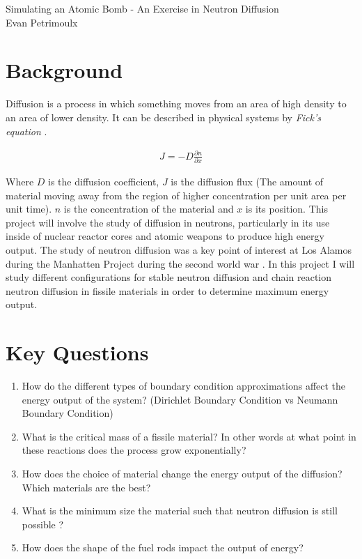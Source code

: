 \documentclass[letterpaper, 12pt]{article}
\begin{document}
    \begin{center}
        {\Large Simulating an Atomic Bomb - An Exercise in Neutron Diffusion\\}
        \vspace{0.5em}
        Evan Petrimoulx \\
    \end{center}

    \pagestyle{fancy}
    \fancyhf{}
    \fancyhead[R]{\today}
    \fancyfoot[R]{}
    \setlength{\droptitle}{-6em}

    \tableofcontents
    \newpage

    \section*{Background}
         Diffusion is a process in which something moves from an area of high density to an area of lower density. It can be described in physical systems by \textit{Fick's equation} \cite{Nuclear_Power_2021}.

         \begin{align*}
            J = -D \frac{\partial n}{\partial x}
         \end{align*}

         \noindent Where $D$ is the diffusion coefficient, $J$ is the diffusion flux (The amount of material moving away from the region of higher concentration per unit area per unit time). $n$ is the concentration of the material and $x$ is its position. This project will involve the study of diffusion in neutrons, particularly in its use inside of nuclear reactor cores and atomic weapons to produce high energy output. The study of neutron diffusion was a key point of interest at Los Alamos during the Manhatten Project during the second world war \cite{Griffiths_2020}. In this project I will study different configurations for stable neutron diffusion and chain reaction neutron diffusion in fissile materials in order to determine maximum energy output.
    \section*{Key Questions}
         \begin{enumerate}
            \item How do the different types of boundary condition approximations affect the energy output of the system? (Dirichlet Boundary Condition vs Neumann Boundary Condition)
            \item What is the critical mass of a fissile material? In other words at what point in these reactions does the process grow exponentially?
            \item How does the choice of material change the energy output of the diffusion? Which materials are the best?
            \item What is the minimum size the material such that neutron diffusion is still possible \cite{Serber_Rhodes_2020}?
            \item How does the shape of the fuel rods impact the output of energy?
         \end{enumerate}
\end{document}
